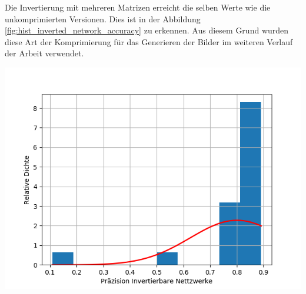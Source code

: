\documentclass[Interploate_hadwritten_Digits.tex]{subfiles}
\begin{document}
	Die Invertierung mit mehreren Matrizen erreicht die selben Werte wie die unkomprimierten Versionen. Dies ist in der Abbildung \ref{fig:hist_inverted_network_accuracy} zu erkennen. Aus diesem Grund wurden diese Art der Komprimierung für das Generieren der Bilder im weiteren Verlauf der Arbeit verwendet.
	\begin{Figure}
		\centering
		\includegraphics[width=\linewidth]{img/results/histogram_inverted_network_accuracy.png}
		\label{fig:hist_inverted_network_accuracy}
	\end{Figure}
	
\end{document}
